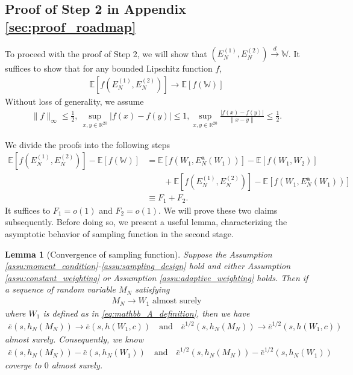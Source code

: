 \documentclass[12pt]{article}
\newtheorem{lemma}{Lemma}
\newcommand{\E}{\mathbb E}								%
\newcommand{\convd}{\overset d \rightarrow}             %
\begin{document}
\subsection{Proof of Step 2 in Appendix \ref{sec:proof_roadmap}}\label{sec:proof_step_2}

To proceed with the proof of Step 2, we will show that $(E_{N}^{(1)},E_{N}^{(2)})\convd \mathbb{W}$. It suffices to show that for any bounded Lipschitz function $f$,
\begin{align}\label{eq:lip_convergence_E1_E2}
	\E\left[f(E_{N}^{(1)},E_{N}^{(2)})\right]\rightarrow\E\left[f(\mathbb{W})\right]
\end{align}
Without loss of generality, we assume 
\begin{align}\label{eq:choice_of_f}
	\|f\|_{\infty}\leq \frac{1}{2},\ \sup_{x,y\in\mathbb{R}^{20}}|f(x)-f(y)|\leq 1,\sup_{x,y\in\mathbb{R}^{20}}\frac{|f(x)-f(y)|}{\|x-y\|}\leq \frac{1}{2}.
\end{align}

\noindent We divide the proofs into the following steps
\begin{align*}
	\E\left[f(E_{N}^{(1)},E_{N}^{(2)})\right]-\E\left[f(\mathbb{W})\right]
	&
	=\E[f(W_1,E_N^{\textbf{a}}(W_1))]-\E[f(W_1,W_2)]\\
	&
	\qquad+\E[f(E_N^{(1)},E_N^{(2)})]-\E[f(W_1,E_N^{\textbf{a}}(W_1))]\\
	&
	\equiv F_1+F_2.
\end{align*}
It suffices to $F_1=o(1)$ and $F_2=o(1)$. We will prove these two claims subsequently. Before doing so, we present a useful lemma, characterizing the asymptotic behavior of sampling function in the second stage. 

\begin{lemma}[Convergence of sampling function]\label{lem:as_convergence_sampling_function}
	Suppose the Assumption \ref{assu:moment_condition}-\ref{assu:sampling_design} hold and either Assumption \ref{assu:constant_weighting} or Assumption \ref{assu:adaptive_weighting} holds. Then if a sequence of random variable $M_N$ satisfying
	\begin{align*}
		M_N \rightarrow W_1 \text{ almost surely}
	\end{align*}
	where $W_1$ is defined as in \eqref{eq:mathbb_A_definition}, then we have 
	\begin{align*}
		\bar e(s,h_N(M_N))\rightarrow \bar e(s,h(W_1,c))\quad\text{and}\quad\bar e^{1/2}(s,h_N(M_N))\rightarrow \bar e^{1/2}(s,h(W_1,c))
	\end{align*}
	almost surely. Consequently, we know 
	\begin{align*}
		\bar e(s,h_N(M_N))-\bar e(s, h_N(W_1))\quad\text{and}\quad \bar e^{1/2}(s,h_N(M_N))-\bar e^{1/2}(s, h_N(W_1))
	\end{align*}
	coverge to $0$ almost surely.
\end{lemma}
\end{document}
